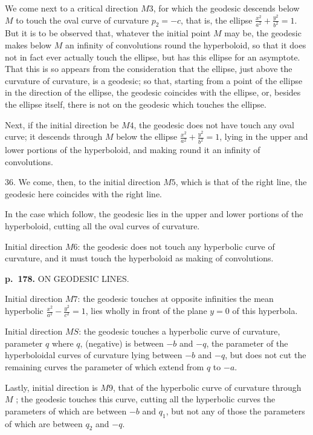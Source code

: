 \documentclass[11pt,a4paper]{book}
\begin{document}
We come next to a critical direction $M3$, for which the geodesic descends below $M$ to touch the oval curve of curvature $p_2 = -c$, that is, the ellipse $\frac{x^2}{a^2} + \frac{y^2}{b^2} = 1$.  But it is to be observed that, whatever the initial point $M$ may be, the geodesic makes below $M$ an infinity of convolutions round the hyperboloid, so that it does not in fact ever actually touch the ellipse, but has this ellipse for an asymptote.  That this is so appears from the consideration that the ellipse, just above the curvature of curvature, is a geodesic; so that, starting from a point of the ellipse in the direction of the ellipse, the geodesic coincides with the ellipse, or, besides the ellipse itself, there is not on the geodesic which touches the ellipse.

Next, if the initial direction be $M4$, the geodesic does not have touch any oval curve; it descends through $M$ below the ellipse $\frac{x^2}{a^2} + \frac{y^2}{b^2} = 1$, lying in the upper and lower portions of the hyperboloid, and making round it an infinity of convolutions.

36. We come, then, to the initial direction $M5$, which is that of the right line, the geodesic here coincides with the right line.

In the case which follow, the geodesic lies in the upper and lower portions of the hyperboloid, cutting all the oval curves of curvature.

Initial direction $M6$: the geodesic does not touch any hyperbolic curve of curvature, and it must touch the hyperboloid as making of convolutions.

\clearpage

\noindent
\textbf{p.~178.}  ON GEODESIC LINES.

Initial direction $M7$: the geodesic touches at opposite infinities the mean hyperbolic $\frac{x^2}{a^2} - \frac{y^2}{c^2} = 1$, lies wholly in front of the plane $y = 0$ of this hyperbola.

Initial direction $MS$: the geodesic touches a hyperbolic curve of curvature, parameter $q$ where $q$, (negative) is between $-b$ and $-q$, the parameter of the hyperboloidal curves of curvature lying between $-b$ and $-q$, but does not cut the remaining curves the parameter of which extend from $q$ to $-a$.

Lastly, initial direction is $M9$, that of the hyperbolic curve of curvature through $M$ ; the geodesic touches this curve, cutting all the hyperbolic curves the parameters of which are between $-b$ and $q_1$, but not any of those the parameters of which are between $q_2$ and $-q$.
\end{document}
